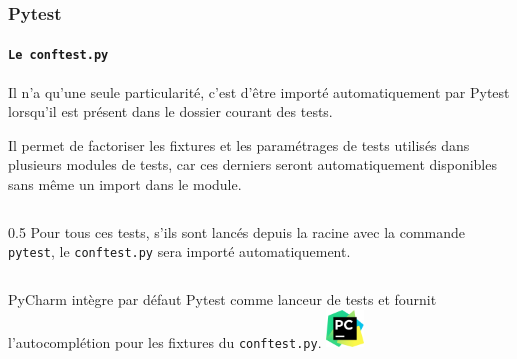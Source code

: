 \documentclass{beamer}
\begin{document}
    \begin{frame}
        \frametitle{Pytest}
        \framesubtitle{\lstinline{Le conftest.py}}
        \transdissolve
        Il n'a qu'une seule particularité, c'est d'être importé automatiquement par Pytest lorsqu'il est présent dans le dossier courant des tests.

        Il permet de factoriser les fixtures et les paramétrages de tests utilisés dans plusieurs modules de tests, car ces derniers seront automatiquement disponibles sans même un import dans le module.
        \begin{columns}
            \column
            {0.5\textwidth}
            Pour tous ces tests, s'ils sont lancés depuis la racine avec la commande \lstinline{pytest}, le \lstinline{conftest.py} sera importé automatiquement.
        \end{columns}
        \bigbreak
        \begin{columns}
            PyCharm intègre par défaut Pytest comme lanceur de tests et fournit l'autocomplétion pour les fixtures du \lstinline{conftest.py}.
            \centering
            \includegraphics[width=1cm]{image/logo-pycharm}
        \end{columns}
    \end{frame}
\end{document}
